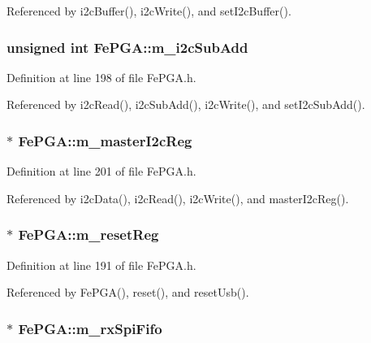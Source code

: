 Referenced by i2cBuffer(), i2cWrite(), and setI2cBuffer().\hypertarget{classFePGA_aba8c2c8d8e0d136826b9dd4c2d7c2e90}{
\subsubsection[{m\_\-i2cSubAdd}]{\setlength{\rightskip}{0pt plus 5cm}unsigned int {\bf FePGA::m\_\-i2cSubAdd}}}
\label{classFePGA_aba8c2c8d8e0d136826b9dd4c2d7c2e90}


Definition at line 198 of file FePGA.h.

Referenced by i2cRead(), i2cSubAdd(), i2cWrite(), and setI2cSubAdd().\hypertarget{classFePGA_adb390ea8de4a6cbce648dc62e4405f32}{
\subsubsection[{m\_\-masterI2cReg}]{$\ast$ {\bf FePGA::m\_\-masterI2cReg}}}
\label{classFePGA_adb390ea8de4a6cbce648dc62e4405f32}


Definition at line 201 of file FePGA.h.

Referenced by i2cData(), i2cRead(), i2cWrite(), and masterI2cReg().\hypertarget{classFePGA_aeff1a2370237a06b50e1ae23d933c862}{
\subsubsection[{m\_\-resetReg}]{$\ast$ {\bf FePGA::m\_\-resetReg}}}
\label{classFePGA_aeff1a2370237a06b50e1ae23d933c862}


Definition at line 191 of file FePGA.h.

Referenced by FePGA(), reset(), and resetUsb().\hypertarget{classFePGA_a3ee7f973bfad39b48bbc1a185e9ffaec}{
\subsubsection[{m\_\-rxSpiFifo}]{$\ast$ {\bf FePGA::m\_\-rxSpiFifo}}}
\label{classFePGA_a3ee7f973bfad39b48bbc1a185e9ffaec}


